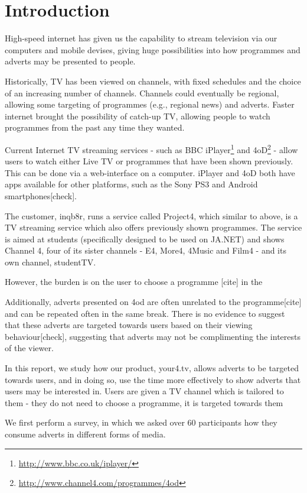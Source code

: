 \section{Introduction}
High-speed internet has given us the capability to stream television via our computers and mobile devises, giving huge possibilities into how programmes and adverts may be presented to people.

Historically, TV has been viewed on channels, with fixed schedules and the choice of an increasing number of channels. Channels could eventually be regional, allowing some targeting of programmes (e.g., regional news) and adverts. Faster internet brought the possibility of catch-up TV, allowing people to watch programmes from the past any time they wanted.

Current Internet TV streaming services - such as BBC iPlayer\footnote{\url{http://www.bbc.co.uk/iplayer/}} and 4oD\footnote{\url{http://www.channel4.com/programmes/4od}} - allow users to watch either Live TV or programmes that have been shown previously. This can be done via a web-interface on a computer. iPlayer and 4oD both have apps available for other platforms, such as the Sony PS3 and Android smartphones[check].

The customer, inqb8r, runs a service called Project4, which similar to above, is a TV streaming service which also offers previously shown programmes. The service is aimed at students (specifically designed to be used on JA.NET) and shows Channel 4, four of its sister channels - E4, More4, 4Music and Film4 - and its own channel, studentTV.

However, the burden is on the user to choose a programme [cite] in the

Additionally, adverts presented on 4od are often unrelated to the programme[cite] and can be repeated often in the same break. There is no evidence to suggest that these adverts are targeted towards users based on their viewing behaviour[check], suggesting that adverts may not be complimenting the interests of the viewer.

In this report, we study how our product, your4.tv, allows adverts to be targeted towards users, and in doing so, use the time more effectively to show adverts that users may be interested in. Users are given a TV channel which is tailored to them - they do not need to choose a programme, it is targeted towards them

We first perform a survey, in which we asked over 60 participants how they consume adverts in different forms of media.


